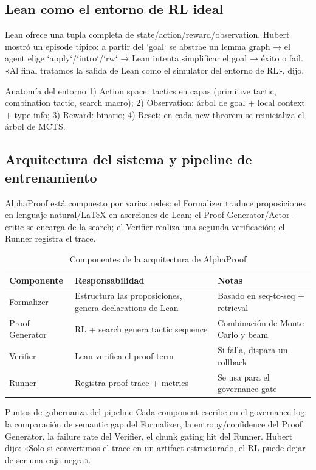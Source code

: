 \documentclass[a4paper]{article}
\begin{document}
\subsection{Lean como el entorno de RL ideal}
Lean ofrece una tupla completa de state/action/reward/observation. Hubert mostró un episode típico: a partir del `goal` se abstrae un lemma graph → el agent elige `apply`/`intro`/`rw` → Lean intenta simplificar el goal → éxito o fail. «Al final tratamos la salida de Lean como el simulator del entorno de RL», dijo.
\begin{importantbox}{Anatomía del entorno}
1) Action space: tactics en capas (primitive tactic, combination tactic, search macro); 2) Observation: árbol de goal + local context + type info; 3) Reward: binario; 4) Reset: en cada new theorem se reinicializa el árbol de MCTS.
\end{importantbox}

\subsection{Arquitectura del sistema y pipeline de entrenamiento}
AlphaProof está compuesto por varias redes: el Formalizer traduce proposiciones en lenguaje natural/LaTeX en aserciones de Lean; el Proof Generator/Actor-critic se encarga de la search; el Verifier realiza una segunda verificación; el Runner registra el trace.
\begin{table}[H]
\centering
\begin{tabular}{p{4.5cm}p{4.5cm}p{4cm}}
\toprule
Componente & Responsabilidad & Notas \\
\midrule
Formalizer & Estructura las proposiciones, genera declarations de Lean & Basado en seq-to-seq + retrieval \\
Proof Generator & RL + search genera tactic sequence & Combinación de Monte Carlo y beam \\
Verifier & Lean verifica el proof term & Si falla, dispara un rollback \\
Runner & Registra proof trace + metrics & Se usa para el governance gate \\
\bottomrule
\end{tabular}
\caption{Componentes de la arquitectura de AlphaProof}
\end{table}
\begin{knowledgebox}{Puntos de gobernanza del pipeline}
Cada component escribe en el governance log: la comparación de semantic gap del Formalizer, la entropy/confidence del Proof Generator, la failure rate del Verifier, el chunk gating hit del Runner. Hubert dijo: «Solo si convertimos el trace en un artifact estructurado, el RL puede dejar de ser una caja negra».
\end{knowledgebox}
\end{document}
